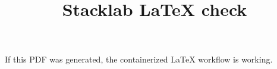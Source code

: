 \documentclass{article}
\title{Stacklab LaTeX check}
\author{}
\date{}
\begin{document}
\maketitle
If this PDF was generated, the containerized LaTeX workflow is working.
\end{document}
